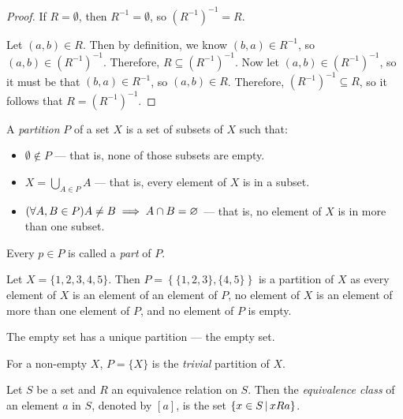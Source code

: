\begin{proof}
    If $R = \emptyset$, then $R^{-1} = \emptyset$, so $\left(R^{-1}\right)^{-1} = R$.

    Let $(a, b) \in R$. Then by definition, we know $(b, a) \in R^{-1}$, so $(a, b) \in \left(R^{-1}\right)^{-1}$. Therefore, $R \subseteq \left(R^{-1}\right)^{-1}$. Now let $(a, b) \in \left(R^{-1}\right)^{-1}$, so it must be that $(b, a) \in R^{-1}$, so $(a, b) \in R$. Therefore, $\left(R^{-1}\right)^{-1} \subseteq R$, so it follows that $R = \left(R^{-1}\right)^{-1}$.
\end{proof}

\begin{defn}\label{partition}
    A \emph{partition} $P$ of a set $X$ is a set of subsets of $X$ such that:
    \begin{itemize}
        \item $\emptyset \notin P$ --- that is, none of those subsets are empty.
        \item $X = \bigcup_{A\in P}A$ --- that is, every element of $X$ is in a subset.
        \item $(\forall A, B \in P) A \neq B \implies A \cap B = \varnothing$ --- that is, no element of $X$ is in more than one subset.
    \end{itemize}
    Every $p \in P$ is called a \emph{part} of $P$.
\end{defn}

\begin{exmp}
    Let $X = \{1, 2, 3, 4, 5\}$. Then $P = \left\{\{1, 2, 3\}, \{4, 5\}\right\}$ is a partition of $X$ as every element of $X$ is an element of an element of $P$, no element of $X$ is an element of more than one element of $P$, and no element of $P$ is empty.
\end{exmp}

\begin{exmp}
    The empty set has a unique partition --- the empty set.
\end{exmp}

\begin{defn}
    For a non-empty $X$, $P = \{X\}$ is the \emph{trivial} partition of $X$.
\end{defn}

\begin{defn}\label{equivalence-class}
    Let $S$ be a set and $R$ an equivalence relation on $S$. Then the \emph{equivalence class} of an element $a$ in $S$, denoted by $\left[a\right]$, is the set $\left\{x \in S \,\middle|\, x R a\right\}$.
\end{defn}

